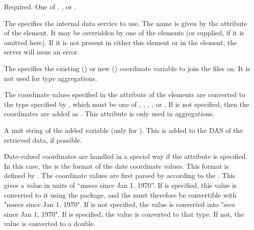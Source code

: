 \begin{description}


Required.  One of , , or
. 


The  specifies the internal data service to use.  The
name is given by the  attribute of the  element.
It may be overridden by one of the  elements (or
supplied, if it is omitted here).  If it is not present in either this
element or in the  element, the server will issue
an error.


The  specifies the existing () or new
() coordinate variable to join the files on. It is not
used for  type aggregations.


The coordinate values specified in the  attribute of the
 elements are converted to the type specified by
, which must be one of , ,
, ,  or . If
 is not specified, then the coordinates are added as
.  This attribute is only used in 
aggregations.


A unit string of the added variable (only for ).  This
is added to the DAS of the retrieved data, if possible.


Date-valued coordinates are handled in a special way if the
 attribute is specified. In this case, the
 is the format of the date
coordinate values. This format is defined by
.  The coordinate values are first
parsed by  according to the .
This gives a  value in units of ``msecs since Jan 1, 1970''. If
 is specified, this value is converted to it using the
 package, and the  must therefore be
convertible with "msecs since Jan 1, 1970". If  is not
specified, the value is converted into "secs since Jan 1, 1970". If
 is specified, the value is converted to that type. If
not, the value is converted to a double.


\end{description}

